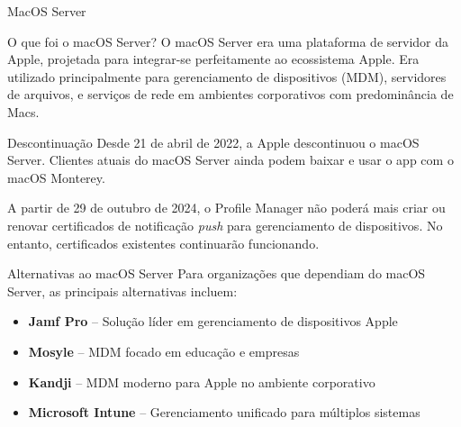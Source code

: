 \documentclass{if-beamer}
\begin{document}

\begin{frame}[allowframebreaks]{MacOS Server}
	\begin{block}{O que foi o macOS Server?}
		O macOS Server era uma plataforma de servidor da Apple, projetada para integrar-se perfeitamente ao ecossistema Apple. Era utilizado principalmente para gerenciamento de dispositivos (MDM), servidores de arquivos, e serviços de rede em ambientes corporativos com predominância de Macs.
	\end{block}
	
	\framebreak
	
	\begin{block}{Descontinuação}
		Desde 21 de abril de 2022, a Apple descontinuou o macOS Server. Clientes atuais do macOS Server ainda podem baixar e usar o app com o macOS Monterey.
		
		\vspace{0.3cm}
		A partir de 29 de outubro de 2024, o Profile Manager não poderá mais criar ou renovar certificados de notificação \textit{push} para gerenciamento de dispositivos. No entanto, certificados existentes continuarão funcionando.
	\end{block}
	
	\framebreak
	
	\begin{block}{Alternativas ao macOS Server}
		Para organizações que dependiam do macOS Server, as principais alternativas incluem:
		\begin{itemize}
			\item \textbf{Jamf Pro} – Solução líder em gerenciamento de dispositivos Apple
			\item \textbf{Mosyle} – MDM focado em educação e empresas
			\item \textbf{Kandji} – MDM moderno para Apple no ambiente corporativo
			\item \textbf{Microsoft Intune} – Gerenciamento unificado para múltiplos sistemas
		\end{itemize}
	\end{block}
\end{frame}

\end{document}

